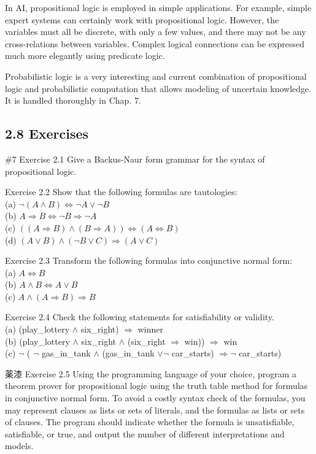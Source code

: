 \documentclass[10pt]{book}
\begin{document}
In AI, propositional logic is employed in simple applications. For example, simple expert systems can certainly work with propositional logic. However, the variables must all be discrete, with only a few values, and there may not be any cross-relations between variables. Complex logical connections can be expressed much more elegantly using predicate logic.

Probabilistic logic is a very interesting and current combination of propositional logic and probabilistic computation that allows modeling of uncertain knowledge. It is handled thoroughly in Chap. 7.

\subsection*{2.8 Exercises}
\#7 Exercise 2.1 Give a Backus-Naur form grammar for the syntax of propositional logic.

Exercise 2.2 Show that the following formulas are tautologies:\\
(a) $\neg(A \wedge B) \Leftrightarrow \neg A \vee \neg B$\\
(b) $A \Rightarrow B \Leftrightarrow \neg B \Rightarrow \neg A$\\
(c) $((A \Rightarrow B) \wedge(B \Rightarrow A)) \Leftrightarrow(A \Leftrightarrow B)$\\
(d) $(A \vee B) \wedge(\neg B \vee C) \Rightarrow(A \vee C)$

Exercise 2.3 Transform the following formulas into conjunctive normal form:\\
(a) $A \Leftrightarrow B$\\
(b) $A \wedge B \Leftrightarrow A \vee B$\\
(c) $A \wedge(A \Rightarrow B) \Rightarrow B$

Exercise 2.4 Check the following statements for satisfiability or validity.\\
(a) (play\_lottery $\wedge$ six\_right) $\Rightarrow$ winner\\
(b) (play\_lottery $\wedge$ six\_right $\wedge$ (six\_right $\Rightarrow$ win)) $\Rightarrow$ win\\
(c) $\neg$ ( $\neg$ gas\_in\_tank $\wedge$ (gas\_in\_tank $\vee \neg$ car\_starts) $\Rightarrow \neg$ car\_starts)

薬漆 Exercise 2.5 Using the programming language of your choice, program a theorem prover for propositional logic using the truth table method for formulas in conjunctive normal form. To avoid a costly syntax check of the formulas, you may represent clauses as lists or sets of literals, and the formulas as lists or sets of clauses. The program should indicate whether the formula is unsatisfiable, satisfiable, or true, and output the number of different interpretations and models.
\end{document}
